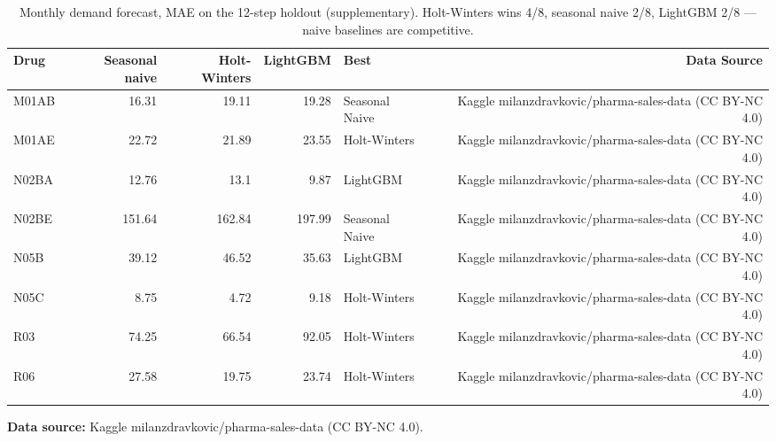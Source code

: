 \begin{table}[t]
\centering
\caption{Monthly demand forecast, MAE on the 12-step holdout (supplementary). Holt-Winters wins 4/8, seasonal naive 2/8, LightGBM 2/8 — naive baselines are competitive.}
\label{tab:forecast}
\begin{tabular}{lrrrlr}
\toprule
Drug & Seasonal naive & Holt-Winters & LightGBM & Best & Data Source \\
\midrule
M01AB & 16.31 & 19.11 & 19.28 & Seasonal Naive & Kaggle milanzdravkovic/pharma-sales-data (CC BY-NC 4.0) \\
M01AE & 22.72 & 21.89 & 23.55 & Holt-Winters & Kaggle milanzdravkovic/pharma-sales-data (CC BY-NC 4.0) \\
N02BA & 12.76 & 13.1 & 9.87 & LightGBM & Kaggle milanzdravkovic/pharma-sales-data (CC BY-NC 4.0) \\
N02BE & 151.64 & 162.84 & 197.99 & Seasonal Naive & Kaggle milanzdravkovic/pharma-sales-data (CC BY-NC 4.0) \\
N05B & 39.12 & 46.52 & 35.63 & LightGBM & Kaggle milanzdravkovic/pharma-sales-data (CC BY-NC 4.0) \\
N05C & 8.75 & 4.72 & 9.18 & Holt-Winters & Kaggle milanzdravkovic/pharma-sales-data (CC BY-NC 4.0) \\
R03 & 74.25 & 66.54 & 92.05 & Holt-Winters & Kaggle milanzdravkovic/pharma-sales-data (CC BY-NC 4.0) \\
R06 & 27.58 & 19.75 & 23.74 & Holt-Winters & Kaggle milanzdravkovic/pharma-sales-data (CC BY-NC 4.0) \\
\bottomrule
\end{tabular}
\par\vspace{2pt}\raggedright\footnotesize \textbf{Data source:} Kaggle milanzdravkovic/pharma-sales-data (CC BY-NC 4.0).
\end{table}
